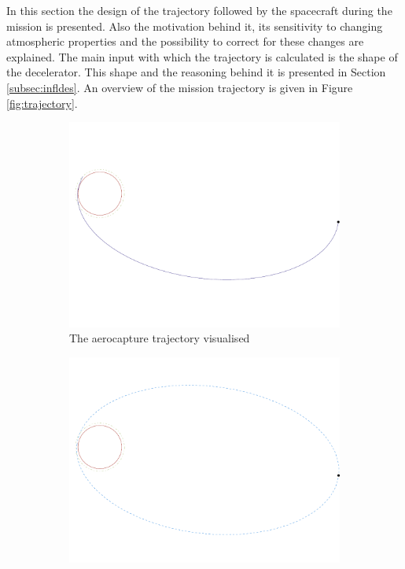In this section the design of the trajectory followed by the spacecraft during the mission is presented. Also the motivation behind it, its sensitivity to changing atmospheric properties and the possibility to correct for these changes are explained. The main input with which the trajectory is calculated is the shape of the decelerator. This shape and the reasoning behind it is presented in Section \ref{subsec:infldes}. An overview of the mission trajectory is given in Figure \ref{fig:trajectory}.

\begin{figure}
	\centering
	
	\begin{subfigure}[b]{0.7\textwidth}
		\vspace{-22mm}
		\includegraphics[width=\textwidth]{./Figure/Orbit/aerocapture_trajectory.pdf}
		\vspace{-25mm}
		\caption{The aerocapture trajectory visualised}
		\label{fig:capture_trajectory}
	\end{subfigure}
	\begin{subfigure}[b]{0.7\textwidth}
		\vspace{-10mm}
		\includegraphics[width=\textwidth]{./Figure/Orbit/parking_trajectory.pdf}

\end{subfigure}
\end{figure}
